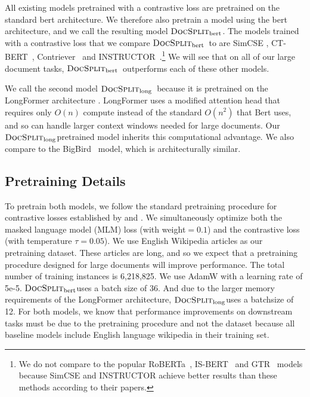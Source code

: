 \documentclass[11pt]{article}
\newcommand{\our}{\mbox{\textsc{DocSplit}}}
\newcommand{\ourbert}{$\our_{\mathrm{bert}}$}
\newcommand{\ourlong}{$\our_{\mathrm{long}}$}
\begin{document}

All existing models pretrained with a contrastive loss are pretrained on the standard bert \cite{Devlin2019BERTPO} architecture.
We therefore also pretrain a model using the bert architecture,
and we call the resulting model \ourbert.
The models trained with a contrastive loss that we compare \ourbert~to are SimCSE \cite{Gao2021SimCSESC}, CT-BERT~\cite{Carlsson2021SemanticRW}, Contriever~\cite{Izacard2021UnsupervisedDI} and INSTRUCTOR~\cite{Su2022OneEA}.\footnote{We do not compare to the popular RoBERTa~\cite{Liu2019RoBERTaAR}, IS-BERT~\cite{Zhang2020AnUS} and GTR~\cite{Ni2021LargeDE} models because SimCSE and INSTRUCTOR achieve better results than these methods according to their papers.}
We will see that on all of our large document tasks, \ourbert~outperforms each of these other models.

We call the second model \ourlong~because it is pretrained on the LongFormer architecture \cite{Beltagy2020LongformerTL}.
LongFormer uses a modified attention head that requires only $O(n)$ compute instead of the standard $O(n^2)$ that Bert uses,
and so can handle larger context windows needed for large documents.
Our \ourlong pretrained model inherits this computational advantage.
We also compare to the BigBird~\cite{Zaheer2020BigBT} model,
which is architecturally similar.

\subsection{Pretraining Details}

To pretrain both models, we follow the standard pretraining procedure for contrastive losses established by \citet{Gao2021SimCSESC} and \citet{Li2022UCTopicUC}.
We simultaneously optimize both the masked language model (MLM) loss (with weight$=0.1$) and the contrastive loss (with temperature $\tau=0.05$).
We use English Wikipedia articles as our pretraining dataset.
These articles are long, and so we expect that a pretraining procedure designed for large documents will improve performance.
The total number of training instances is 6,218,825.
We use AdamW \cite{Kingma2014AdamAM} with a learning rate of 5e-5.
\ourbert uses a batch size of 36.
And due to the larger memory requirements of the LongFormer architecture,
\ourlong uses a batchsize of 12.
For both models, we know that performance improvements on downstream tasks must be due to the pretraining procedure and not the dataset because all baseline models include English language wikipedia in their training set.
\end{document}
